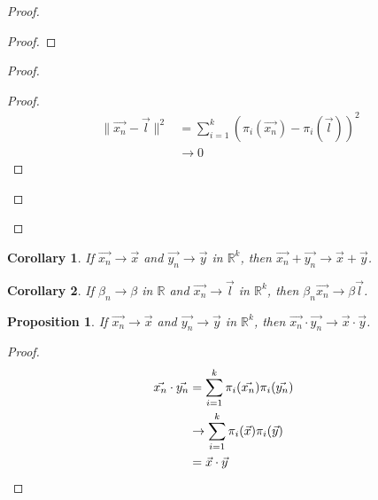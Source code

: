 \documentclass{book}
\let\qed\relax
\newtheorem{prop}{Proposition}[chapter]
\newtheorem{cor}{Corollary}[prop]
\theoremstyle{definition}
\begin{document}
\begin{proof}
\pf
{}
\begin{proof}
\end{proof}
\begin{proof}
	\begin{proof}
		\pf
		\begin{align*}
			\| \vec{x_n} - \vec{l} \|^2
			& = \sum_{i=1}^k (\pi_i(\vec{x_n}) - \pi_i(\vec{l}))^2 \\
			& \rightarrow 0
		\end{align*}
	\end{proof}
\end{proof}
\qed
\end{proof}

\begin{cor}
If $\vec{x_n} \rightarrow \vec{x}$ and $\vec{y_n} \rightarrow \vec{y}$ in $\mathbb{R}^k$, then $\vec{x_n} + \vec{y_n} \rightarrow \vec{x} + \vec{y}$.
\end{cor}

\begin{cor}
If $\beta_n \rightarrow \beta$ in $\mathbb{R}$ and $\vec{x_n} \rightarrow \vec{l}$ in $\mathbb{R}^k$, then $\beta_n \vec{x_n} \rightarrow \beta \vec{l}$.
\end{cor}

\begin{prop}
If $\vec{x_n} \rightarrow \vec{x}$ and $\vec{y_n} \rightarrow \vec{y}$ in $\mathbb{R}^k$, then $\vec{x_n} \cdot \vec{y_n} \rightarrow \vec{x} \cdot \vec{y}$.
\end{prop}

\begin{proof}
\pf
\begin{align*}
\vec{x_n} \cdot \vec{y_n}
& = \sum_{i=1}^k \pi_i(\vec{x_n}) \pi_i(\vec{y_n}) \\
& \rightarrow \sum_{i=1}^k \pi_i(\vec{x}) \pi_i(\vec{y}) \\
& = \vec{x} \cdot \vec{y} & \qed
\end{align*}
\end{proof}
\end{document}
